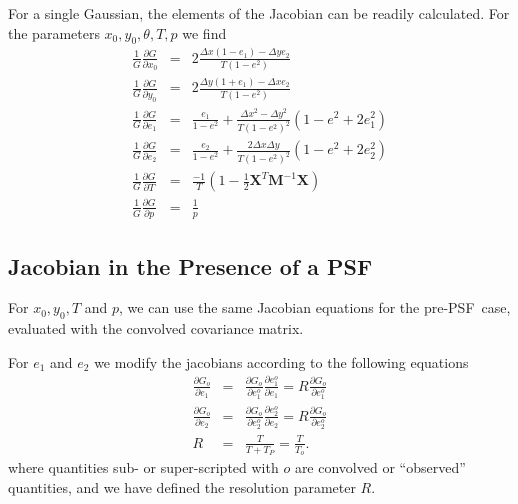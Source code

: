 \documentclass[12pt,preprint]{aastex}
\newcommand{\M}{\textbf{M}}
\newcommand{\X}{\textbf{X}}
\newcommand{\Dx}{\ensuremath{\Delta x}}
\newcommand{\Dy}{\ensuremath{\Delta y}}
\newcommand{\psf}{PSF}
\begin{document}
For a single Gaussian, the elements of the Jacobian can be readily
calculated.  For the parameters $x_0,y_0,\theta,T,p$ we find
\begin{eqnarray}
\frac{1}{G} \frac{\partial G}{\partial x_0}
    & = & 2 \frac{ \Dx (1-e_1) - \Dy e_2 }{T (1-e^2)} \\
\frac{1}{G} \frac{\partial G}{\partial y_0}
    & = & 2 \frac{ \Dy (1+e_1) - \Dx e_2 }{T (1-e^2)} \\
\frac{1}{G} \frac{\partial G}{\partial e_1}
  & = & \frac{e_1}{1-e^2} + \frac{\Dx^2-\Dy^2}{T (1-e^2)^2} (1-e^2 + 2 e_1^2) \\
\frac{1}{G} \frac{\partial G}{\partial e_2}
  & = & \frac{e_2}{1-e^2} + \frac{2 \Dx \Dy}{T (1-e^2)^2} (1-e^2 + 2 e_2^2) \\
\frac{1}{G} \frac{\partial G}{\partial T}
  & = & \frac{-1}{T} \left( 1 - \frac{1}{2} \X^T \M^{-1} \X  \right)  \\
\frac{1}{G} \frac{\partial G}{\partial p}
  & = & \frac{1}{p}
\end{eqnarray}

\subsection{Jacobian in the Presence of a \psf}

For $x_0,y_0,T$ and $p$, we can use the same Jacobian equations for the pre-\psf\
case, evaluated with the convolved covariance matrix. 

For $e_1$ and $e_2$ we modify the jacobians according to the following equations
\begin{eqnarray}
\frac{\partial G_o}{\partial e_1} 
 & = & \frac{\partial G_o}{\partial e_1^o} \frac{\partial e_1^o}{\partial e_1} 
    =  R \frac{\partial G_o}{\partial e_1^o}\\
\frac{\partial G_o}{\partial e_2} 
 & = & \frac{\partial G_o}{\partial e_2^o} \frac{\partial e_2^o}{\partial e_2}
    =  R \frac{\partial G_o}{\partial e_2^o}\\
R & = & \frac{T}{T + T_P} = \frac{T}{T_o}.
\end{eqnarray}
where quantities sub- or super-scripted with $o$ are convolved or ``observed''
quantities, and we have defined the resolution parameter $R$.
\end{document}
